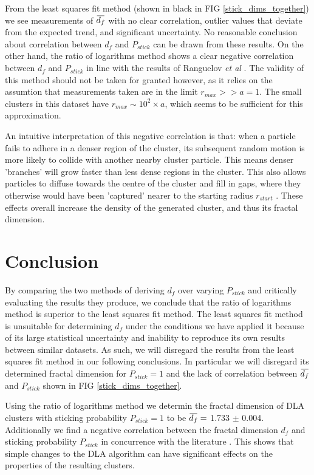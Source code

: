 \documentclass[10pt, twocolumn]{article} %
\newcommand{\overbar}[1]{\mkern 1.5mu\overline{\mkern-1.5mu#1\mkern-1.5mu}\mkern 1.5mu}
\begin{document}
  From the least squares fit method (shown in black in FIG \ref{stick_dims_together}) we see measurements of $\overbar{d_f}$ with no clear correlation, outlier values that deviate from the expected trend, and significant uncertainty. No reasonable conclusion about correlation between $d_f$ and $P_{stick}$ can be drawn from these results. On the other hand, the ratio of logarithms method shows a clear negative correlation between $d_f$ and $P_{stick}$ in line with the results of Ranguelov \textit{et al} \cite{Ranguelov_2011}. The validity of this method should not be taken for granted however, as it relies on the assumtion that measurements taken are in the limit $r_{max} >> a=1$. The small clusters in this dataset have $r_{max} \sim 10^2 \times a$, which seems to be sufficient for this approximation.

  An intuitive interpretation of this negative correlation is that: when a particle fails to adhere in a denser region of the cluster, its subsequent random motion is more likely to collide with another nearby cluster particle. This means denser 'branches' will grow faster than less dense regions in the cluster. This also allows particles to diffuse towards the centre of the cluster and fill in gaps, where they otherwise would have been 'captured' nearer to the starting radius $r_{start}$ \cite{Ranguelov_2011}. These effects overall increase the density of the generated cluster, and thus its fractal dimension.

\section*{Conclusion}

  By comparing the two methods of deriving $d_f$ over varying $P_{stick}$ and critically evaluating the results they produce, we conclude that the ratio of logarithms method is superior to the least squares fit method. The least squares fit method is unsuitable for determining $d_f$ under the conditions we have applied it because of its large statistical uncertainty and inability to reproduce its own results between similar datasets. As such, we will disregard the results from the least squares fit method in our following conclusions. In particular we will disregard its determined fractal dimension for $P_{stick} = 1$ and the lack of correlation between $\overbar{d_f}$ and $P_{stick}$ shown in FIG \ref{stick_dims_together}.

  Using the ratio of logarithms method we determin the fractal dimension of DLA clusters with sticking probability $P_{stick} = 1$ to be $\overbar{d_f} =$ 1.733 $\pm$ 0.004. Additionally we find a negative correlation between the fractal dimension $d_f$ and sticking probability $P_{stick}$ in concurrence with the literature \cite{Ranguelov_2011, Pietronero_1984}. This shows that simple changes to the DLA algorithm can have significant effects on the properties of the resulting clusters.
  
\end{document}
